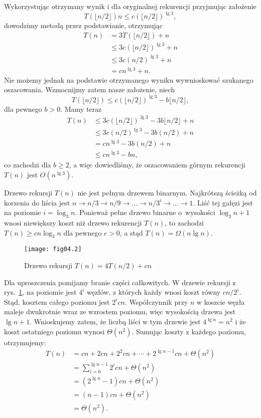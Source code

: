 Wykorzystując otrzymany wynik i dla oryginalnej rekurencji przyjmując założenie
\[
	T(\lfloor n/2\rfloor)n\le c(\lfloor n/2\rfloor)^{\lg 3},
\]
dowodzimy metodą przez podstawianie, otrzymując
\begin{align*}
	T(n) &= 3T(\lfloor n/2\rfloor)+n \\
	&\le 3c(\lfloor n/2\rfloor)^{\lg 3}+n \\
	&\le 3c(n/2)^{\lg 3}+n \\
	&= cn^{\lg 3}+n.
\end{align*}
Nie możemy jednak na podstawie otrzymanego wyniku wywnioskować szukanego oszacowania. Wzmocnijmy zatem nasze założenie, niech
\[
	T(\lfloor n/2\rfloor) \le c(\lfloor n/2\rfloor)^{\lg 3}-b\lfloor n/2\rfloor,
\]
dla pewnego $b>0$. Mamy teraz
\begin{align*}
	T(n) &\le 3c(\lfloor n/2\rfloor)^{\lg 3}-3b\lfloor n/2\rfloor+n \\
	&\le 3c(n/2)^{\lg 3}-3b(n/2)+n \\
	&= cn^{\lg 3}-3b(n/2)+n \\
	&\le cn^{\lg 3}-bn,
\end{align*}
co zachodzi dla $b\ge2$, a więc dowiedliśmy, że oszacowaniem górnym rekurencji $T(n)$ jest $O(n^{\lg3})$.

\exercise{} %
Drzewo rekursji $T(n)$ nie jest pełnym drzewem binarnym. Najkrótszą ścieżką od korzenia do liścia jest $n\to n/3\to n/9\to\dots\to n/3^i\to\dots\to1$. Liść tej gałęzi jest na poziomie $i=\log_3n$. Ponieważ pełne drzewo binarne o~wysokości $\log_3n+1$ wnosi niewiększy koszt niż drzewo rekurencji $T(n)$, to zachodzi $T(n)\ge cn\log_3n$ dla pewnego $c>0$, a stąd $T(n)=\Omega(n\lg n)$.

\exercise{} %
\begin{figure}[ht]
	\begin{center}
		\texttt{[image: fig04.2]}
	\end{center}
	\caption{Drzewo rekursji $T(n)=4T(n/2)+cn$} \label{fig:4.2-3}
\end{figure}

Dla uproszczenia pomijamy branie części całkowitych. W drzewie rekursji z rys.~\ref{fig:4.2-3}, na  poziomie jest $4^i$ węzłów, z których każdy wnosi koszt równy $cn/2^i$. Stąd, kosztem całego poziomu jest $2^icn$. Współczynnik przy $n$ w koszcie węzła maleje dwukrotnie wraz ze wzrostem poziomu, więc wysokością drzewa jest $\lg n+1$. Wnioskujemy zatem, że liczbą liści w tym drzewie jest $4^{\lg n}=n^2$ i że koszt ostatniego poziomu wynosi $\Theta(n^2)$. Sumując koszty z każdego poziomu, otrzymujemy:
\begin{align*}
	T(n) &= cn+2cn+2^2cn+\cdots+2^{\lg n-1}cn+\Theta(n^2) \\
	&= \sum_{i=0}^{\lg n-1}2^icn+\Theta(n^2) \\
	&= (2^{\lg n}-1)cn+\Theta(n^2) \\
	&= (n-1)cn+\Theta(n^2) \\
	&= \Theta(n^2).
\end{align*}

